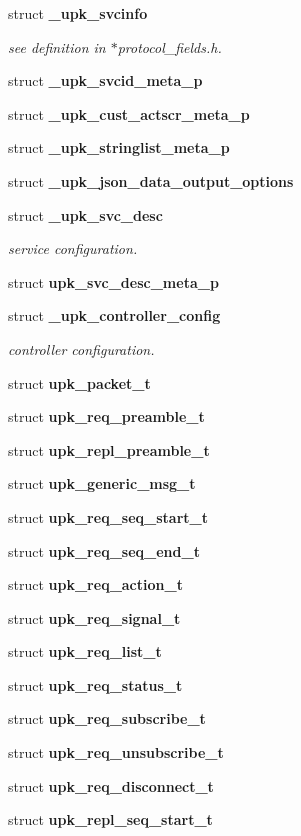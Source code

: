 \begin{DoxyCompactItemize}
\item 
struct {\bf \_\-upk\_\-svcinfo}
\begin{DoxyCompactList}\small\item\em see definition in $\ast$protocol\_\-fields.h. \end{DoxyCompactList}\item 
struct {\bf \_\-upk\_\-svcid\_\-meta\_\-p}
\item 
struct {\bf \_\-upk\_\-cust\_\-actscr\_\-meta\_\-p}
\item 
struct {\bf \_\-upk\_\-stringlist\_\-meta\_\-p}
\item 
struct {\bf \_\-upk\_\-json\_\-data\_\-output\_\-options}
\item 
struct {\bf \_\-upk\_\-svc\_\-desc}
\begin{DoxyCompactList}\small\item\em service configuration. \end{DoxyCompactList}\item 
struct {\bf upk\_\-svc\_\-desc\_\-meta\_\-p}
\item 
struct {\bf \_\-upk\_\-controller\_\-config}
\begin{DoxyCompactList}\small\item\em controller configuration. \end{DoxyCompactList}\item 
struct {\bf upk\_\-packet\_\-t}
\item 
struct {\bf upk\_\-req\_\-preamble\_\-t}
\item 
struct {\bf upk\_\-repl\_\-preamble\_\-t}
\item 
struct {\bf upk\_\-generic\_\-msg\_\-t}
\item 
struct {\bf upk\_\-req\_\-seq\_\-start\_\-t}
\item 
struct {\bf upk\_\-req\_\-seq\_\-end\_\-t}
\item 
struct {\bf upk\_\-req\_\-action\_\-t}
\item 
struct {\bf upk\_\-req\_\-signal\_\-t}
\item 
struct {\bf upk\_\-req\_\-list\_\-t}
\item 
struct {\bf upk\_\-req\_\-status\_\-t}
\item 
struct {\bf upk\_\-req\_\-subscribe\_\-t}
\item 
struct {\bf upk\_\-req\_\-unsubscribe\_\-t}
\item 
struct {\bf upk\_\-req\_\-disconnect\_\-t}
\item 
struct {\bf upk\_\-repl\_\-seq\_\-start\_\-t}
\item 

\end{DoxyCompactItemize}
